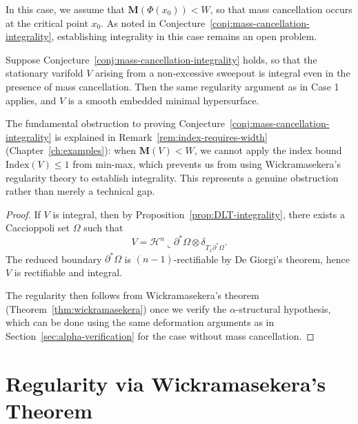 In this case, we assume that $\mathbf{M}(\Phi(x_0)) < W$, so that mass cancellation occurs at the critical point $x_0$. As noted in Conjecture~\ref{conj:mass-cancellation-integrality}, establishing integrality in this case remains an open problem.

\begin{proposition}\label{prop:regularity-with-cancellation}
    Suppose Conjecture~\ref{conj:mass-cancellation-integrality} holds, so that the stationary varifold $V$ arising from a non-excessive sweepout is integral even in the presence of mass cancellation. Then the same regularity argument as in Case 1 applies, and $V$ is a smooth embedded minimal hypersurface.
\end{proposition}

\begin{remark}
The fundamental obstruction to proving Conjecture~\ref{conj:mass-cancellation-integrality} is explained in Remark~\ref{rem:index-requires-width} (Chapter~\ref{ch:examples}): when $\mathbf{M}(V) < W$, we cannot apply the index bound $\mathrm{Index}(V) \leq 1$ from min-max, which prevents us from using Wickramasekera's regularity theory to establish integrality. This represents a genuine obstruction rather than merely a technical gap.
\end{remark}

\begin{proof}
If $V$ is integral, then by Proposition~\ref{prop:DLT-integrality}, there exists a Caccioppoli set $\Omega$ such that
\[
    V = \mathcal{H}^n \llcorner \partial^*\Omega \otimes \delta_{T_x\partial^*\Omega}.
\]
The reduced boundary $\partial^*\Omega$ is $(n-1)$-rectifiable by De Giorgi's theorem, hence $V$ is rectifiable and integral.

The regularity then follows from Wickramasekera's theorem (Theorem~\ref{thm:wickramasekera}) once we verify the $\alpha$-structural hypothesis, which can be done using the same deformation arguments as in Section~\ref{sec:alpha-verification} for the case without mass cancellation.
\end{proof}

\section{Regularity via Wickramasekera's Theorem}

